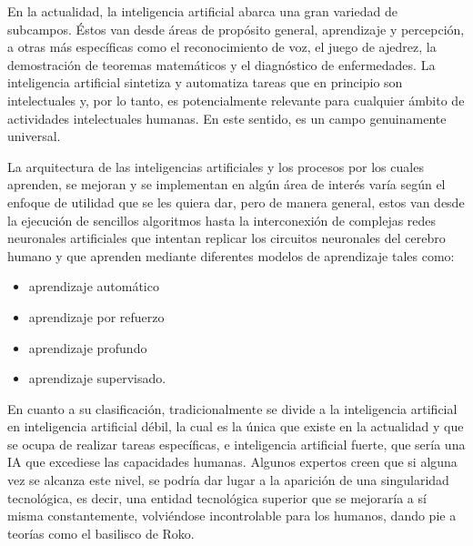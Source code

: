 En la actualidad, la inteligencia artificial abarca una gran variedad de subcampos. Éstos van desde áreas de propósito general, aprendizaje y percepción, a otras más específicas como el reconocimiento de voz, el juego de ajedrez, la demostración de teoremas matemáticos y el diagnóstico de enfermedades. La inteligencia artificial sintetiza y automatiza tareas que en principio son intelectuales y, por lo tanto, es potencialmente relevante para cualquier ámbito de actividades intelectuales humanas. En este sentido, es un campo genuinamente universal.

La arquitectura de las inteligencias artificiales y los procesos por los cuales aprenden, se mejoran y se implementan en algún área de interés varía según el enfoque de utilidad que se les quiera dar, pero de manera general, estos van desde la ejecución de sencillos algoritmos hasta la interconexión de complejas redes neuronales artificiales que intentan replicar los circuitos neuronales del cerebro humano y que aprenden mediante diferentes modelos de aprendizaje tales como:  
\begin{itemize}
\item aprendizaje automático 
\item aprendizaje por refuerzo 
\item aprendizaje profundo 
\item aprendizaje supervisado\cite{rodriguez2017machine}.
\end{itemize}

En cuanto a su clasificación, tradicionalmente se divide a la inteligencia artificial en inteligencia artificial débil, la cual es la única que existe en la actualidad y que se ocupa de realizar tareas específicas, e inteligencia artificial fuerte, que sería una IA que excediese las capacidades humanas. Algunos expertos creen que si alguna vez se alcanza este nivel, se podría dar lugar a la aparición de una singularidad tecnológica, es decir, una entidad tecnológica superior que se mejoraría a sí misma constantemente, volviéndose incontrolable para los humanos, dando pie a teorías como el basilisco de Roko.\cite{basilico}


